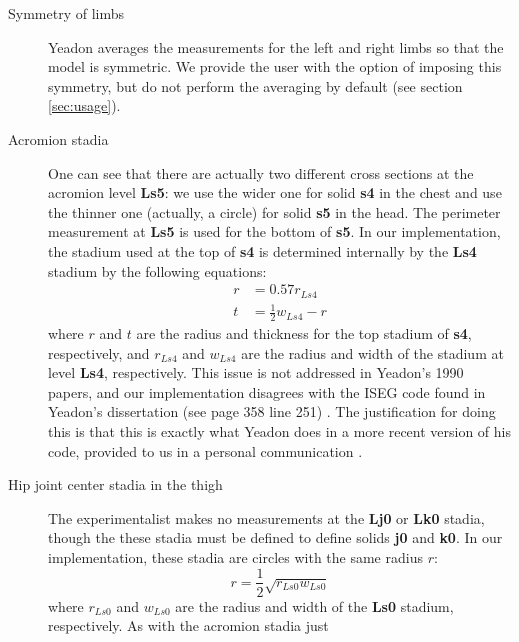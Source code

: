 \documentclass[10pt]{article}
\begin{document}
\begin{description}
    \item[Symmetry of limbs] Yeadon averages the measurements for the left and
        right limbs so that the model is symmetric. We provide the user with
        the option of imposing this symmetry, but do not perform the averaging
        by default (see section \ref{sec:usage}).
    \item[Acromion stadia] One can see that there are actually two different
        cross sections at the acromion level \textbf{Ls5}: we use the wider one
        for solid \textbf{s4} in the chest and use the thinner one (actually, a
        circle) for solid \textbf{s5} in the head. The perimeter measurement at
        \textbf{Ls5} is used for the bottom of \textbf{s5}. In our
        implementation, the stadium used at the top of \textbf{s4} is
        determined internally by the \textbf{Ls4} stadium by the following
        equations:
        \begin{align}
            r &= 0.57 r_{Ls4} \\
            t &= \frac{1}{2}w_{Ls4} - r
        \end{align}
        where $r$ and $t$ are the radius and thickness for the top stadium of
        \textbf{s4}, respectively, and $r_{Ls4}$ and $w_{Ls4}$ are the radius
        and width of the stadium at level \textbf{Ls4}, respectively.
        This issue is not addressed in Yeadon's 1990 papers, and our
        implementation disagrees with the ISEG code found in Yeadon's
        dissertation (see page 358 line 251) \cite{Yeadon1984a}. The
        justification for doing this is
        that this is exactly what Yeadon does in a more recent version of his
        code, provided to us in a personal communication .
    \item[Hip joint center stadia in the thigh] The experimentalist makes no
        measurements at the \textbf{Lj0} or \textbf{Lk0} stadia, though the
        these stadia must be defined to define solids \textbf{j0} and
        \textbf{k0}.  In our implementation, these stadia are circles with the
        same radius $r$:
        \begin{equation}
            r = \frac{1}{2}\sqrt{r_{Ls0} w_{Ls0}}
        \end{equation}
        where $r_{Ls0}$ and $w_{Ls0}$ are the radius and width of the
        \textbf{Ls0} stadium, respectively. As with the acromion stadia just

\end{description}
\end{document}

